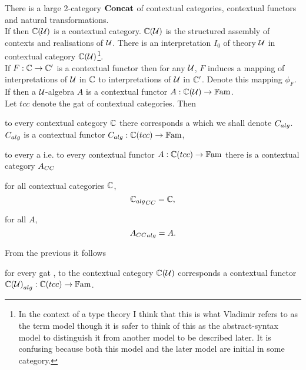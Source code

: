 \note There is a large 2-category $\catofccs$ of contextual categories, contextual functors and natural transformations. \\

\note
If \isagat[U] then $\CofU$ is a contextual category. 
$\CofU$ is the structured assembly of contexts and realisations of $\gat[U]$.
There is an interpretation $I_0$ of theory $\gat[U]$ in contextual category
$\CofU$\footnote{
In the context of a type theory I think that this is what Vladimir refers to as the term model though it is safer to think of this as the abstract-syntax model to distinguish it from another model to be described later. It is confusing because both this model and the later model are initial in some category.}.\\

\note If $F : \ccat[C] \morph \ccat[C']$ is a contextual functor then for any $\gat[U]$, 
$F$ induces a mapping of interpretations of $\gat[U]$ in $\ccat[C]$ to interpretations of $\gat[U]$ in $\ccat[C']$. Denote this mapping $\phi_F$. \\

\note
If \isagat[U] then a $\gat[U]$-algebra $A$ is a contextual functor $A: \CofU \morph \Fam$. \\

\note 
Let $tcc$ denote the gat of contextual categories. Then
\begin{point}
to every contextual category $\ccat[C]$ there corresponds a \tccalgebra 
which we shall denote $\alg{C}$.  $\alg{C}$ is a contextual functor $\alg{C} :\ccat[C](tcc) \morph \Fam$,
\end{point}
\begin{point}
to every a \tccalgebra i.e. to every contextual functor $A :\ccat[C](tcc) \morph \Fam$ there is a contextual category $\cc{A}$
\end{point}
\begin{point}
for all contextual categories $\ccat[C]$,
\begin{equation}
\cc{\alg{\ccat[C]}}= \ccat[C],
\end{equation}
\end{point}
\begin{point}
for all \tccalgebras $A$,
\begin{equation}
\alg{\cc{A}} = A.
\end{equation}
\end{point}

\note
From the previous it follows 
\begin{pointeq}
\label{cualg}
for every gat \gat[U], to the contextual category $\CofU$ corresponds a contextual functor
   $\alg{\CofU} :\ccat[C](tcc) \morph \Fam$. \\
\end{pointeq} 

